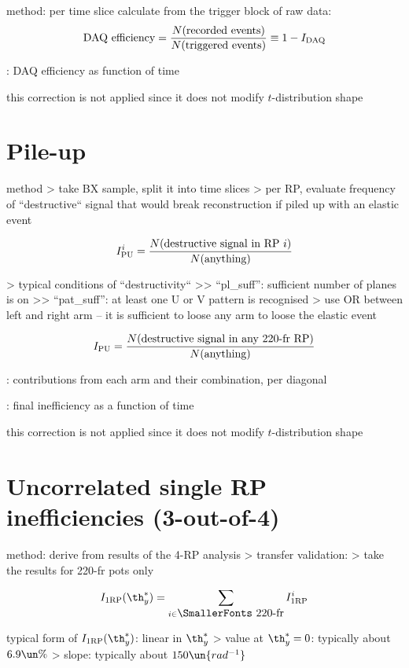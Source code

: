 \> method: per time slice calculate from the trigger block of raw data:
$$\hbox{DAQ efficiency} = {N(\hbox{recorded events})\over N(\hbox{triggered events})} \equiv 1 - I_{\rm DAQ}$$

\> : DAQ efficiency as function of time

\> this correction is not applied since it does not modify $t$-distribution shape



\section[efficiency-pileup]{Pile-up}

\> method
\>> take BX sample, split it into time slices
\>> per RP, evaluate frequency of ``destructive`` signal that would break reconstruction if piled up with an elastic event

$$I^{i}_{\rm PU} = {N(\hbox{destructive signal in RP $i$})\over N(\hbox{anything})}$$

\>> typical conditions of ``destructivity``
\>>> ``pl\_suff'': sufficient number of planes is on
\>>> ``pat\_suff'': at least one U or V pattern is recognised 
\>> use OR between left and right arm -- it is sufficient to loose any arm to loose the elastic event

$$I_{\rm PU} = {N(\hbox{destructive signal in any 220-fr RP})\over N(\hbox{anything})}$$


\> : contributions from each arm and their combination, per diagonal

\> : final inefficiency as a function of time

\> this correction is not applied since it does not modify $t$-distribution shape


\section[efficiency-uncorrelated]{Uncorrelated single RP inefficiencies (3-out-of-4)}

\> method: derive from results of the 4-RP analysis
\>> transfer validation: 
\>> take the results for 220-fr pots only

$$I_{\rm 1RP}(\th_y^*) = \sum\limits_{i \in\hbox{\SmallerFonts 220-fr}} I_{\rm 1RP}^i$$

\> typical form of $I_{\rm 1RP}(\th_y^*)$: linear in $\th^*_y$
\>> value at $\th_y^* = 0$: typically about $6.9\un{\%}$
\>> slope: typically about $150\un{rad^{-1}}$

